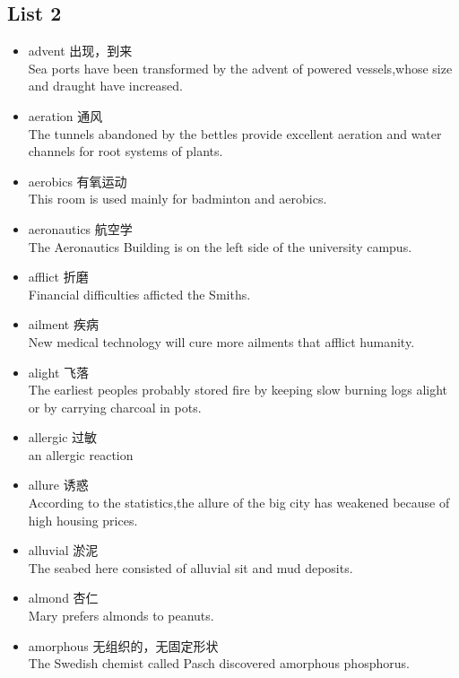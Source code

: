 \documentclass[a4paper,10pt]{article}
\begin{document}
\begin{CJK*}{UTF8}{gkai}
\newpage
\section{List 2}
\begin{itemize}
\item advent 出现，到来\\
\hspace{1cm} Sea ports have been transformed by the advent of powered vessels,whose size and draught have increased.
\item aeration 通风\\
\hspace{1cm}The tunnels abandoned by the bettles provide excellent aeration and water channels for root systems of plants.
\item aerobics 有氧运动\\
\hspace{1cm}This room is used mainly for badminton and aerobics.
\item aeronautics 航空学\\
\hspace{1cm}The Aeronautics Building is on the left side of the university campus.
\item afflict 折磨\\
\hspace{1cm}Financial difficulties afficted the Smiths.
\item ailment 疾病\\
\hspace{1cm}New medical technology will cure more ailments that afflict humanity.
\item alight 飞落\\
\hspace{1cm}The earliest peoples probably stored fire by keeping slow burning logs alight or by carrying charcoal in pots.
\item allergic 过敏\\
\hspace{1cm}an allergic reaction
\item allure 诱惑\\
\hspace{1cm}According to the statistics,the allure of the big city has weakened because of high housing prices.
\item alluvial 淤泥\\
\hspace{1cm}The seabed here consisted of alluvial sit and mud deposits.
\item almond 杏仁\\
\hspace{1cm}Mary prefers almonds to peanuts.
\item amorphous 无组织的，无固定形状 \\
\hspace{1cm}The Swedish chemist called Pasch discovered amorphous phosphorus.
\end{itemize}



\end{CJK*}
\end{document}
